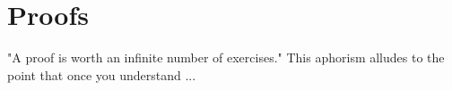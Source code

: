 \chapter{Proofs}

"A proof is worth an infinite number of exercises." This aphorism alludes to the point that once you understand ...




\endinput